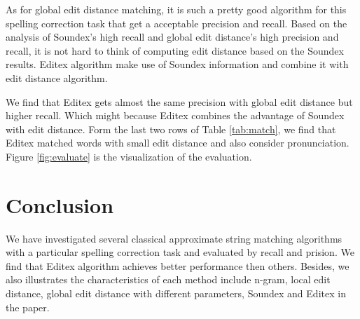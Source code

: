 \documentclass[11pt]{article}
\begin{document}
As for global edit distance matching, it is such a pretty good algorithm for this spelling correction task that get a acceptable precision and recall. Based on the analysis of Soundex's high recall and global edit distance's high precision and recall, it is not hard to think of computing edit distance based on the Soundex results. Editex algorithm make use of Soundex information and combine it with edit distance algorithm. 

We find that Editex gets almost the same precision with global edit distance but higher recall. Which might because Editex combines the advantage of Soundex with edit distance. Form the last two rows of Table \ref{tab:match}, we find that Editex matched words with small edit distance and also consider pronunciation. Figure \ref{fig:evaluate} is the visualization of the evaluation.


\section{Conclusion}

We have investigated several classical approximate string matching algorithms with a particular spelling correction task and evaluated by recall and prision. We find that Editex algorithm achieves better performance then others. Besides,  we also illustrates the characteristics of each method include n-gram, local edit distance, global edit distance with different parameters, Soundex and Editex in the paper. 




\end{document}

